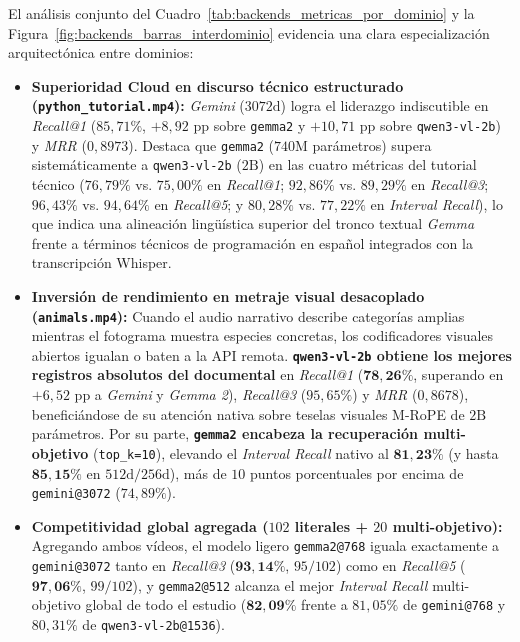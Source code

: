 El análisis conjunto del Cuadro~\ref{tab:backends_metricas_por_dominio} y la Figura~\ref{fig:backends_barras_interdominio} evidencia una clara especialización arquitectónica entre dominios:

\begin{itemize}
    \item \textbf{Superioridad Cloud en discurso técnico estructurado (\texttt{python\_tutorial.mp4}):} \textit{Gemini} ($3072\text{d}$) logra el liderazgo indiscutible en \textit{Recall@1} ($85,71\%$, $+8,92\text{ pp}$ sobre \texttt{gemma2} y $+10,71\text{ pp}$ sobre \texttt{qwen3-vl-2b}) y \textit{MRR} ($0,8973$). Destaca que \texttt{gemma2} ($740\text{M}$ parámetros) supera sistemáticamente a \texttt{qwen3-vl-2b} ($2\text{B}$) en las cuatro métricas del tutorial técnico ($76,79\%$ vs. $75,00\%$ en \textit{Recall@1}; $92,86\%$ vs. $89,29\%$ en \textit{Recall@3}; $96,43\%$ vs. $94,64\%$ en \textit{Recall@5}; y $80,28\%$ vs. $77,22\%$ en \textit{Interval Recall}), lo que indica una alineación lingüística superior del tronco textual \textit{Gemma} frente a términos técnicos de programación en español integrados con la transcripción Whisper.

    \item \textbf{Inversión de rendimiento en metraje visual desacoplado (\texttt{animals.mp4}):} Cuando el audio narrativo describe categorías amplias mientras el fotograma muestra especies concretas, los codificadores visuales abiertos igualan o baten a la API remota. \textbf{\texttt{qwen3-vl-2b} obtiene los mejores registros absolutos del documental} en \textit{Recall@1} ($\mathbf{78,26\%}$, superando en $+6,52\text{ pp}$ a \textit{Gemini} y \textit{Gemma 2}), \textit{Recall@3} ($95,65\%$) y \textit{MRR} ($0,8678$), beneficiándose de su atención nativa sobre teselas visuales M-RoPE de $2\text{B}$ parámetros. Por su parte, \textbf{\texttt{gemma2} encabeza la recuperación multi-objetivo} (\texttt{top\_k=10}), elevando el \textit{Interval Recall} nativo al $\mathbf{81,23\%}$ (y hasta $\mathbf{85,15\%}$ en $512\text{d}/256\text{d}$), más de $10$ puntos porcentuales por encima de \texttt{gemini@3072} ($74,89\%$).

    \item \textbf{Competitividad global agregada ($102$ literales + $20$ multi-objetivo):} Agregando ambos vídeos, el modelo ligero \texttt{gemma2@768} iguala exactamente a \texttt{gemini@3072} tanto en \textit{Recall@3} ($\mathbf{93,14\%}$, $95/102$) como en \textit{Recall@5} ($\mathbf{97,06\%}$, $99/102$), y \texttt{gemma2@512} alcanza el mejor \textit{Interval Recall} multi-objetivo global de todo el estudio ($\mathbf{82,09\%}$ frente a $81,05\%$ de \texttt{gemini@768} y $80,31\%$ de \texttt{qwen3-vl-2b@1536}).
\end{itemize}

